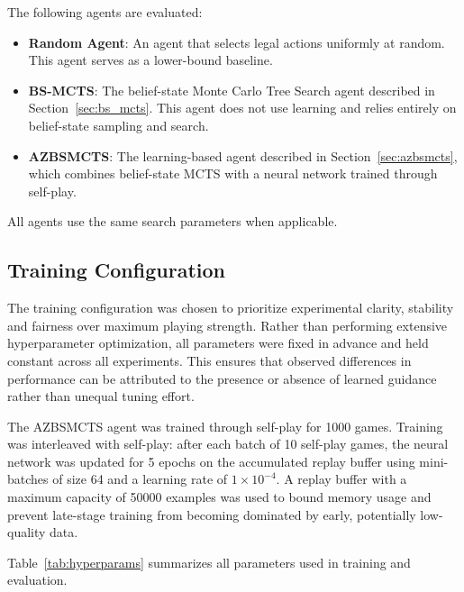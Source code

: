 \documentclass[12pt,oneside,openright]{article}
\begin{document}
The following agents are evaluated:

\begin{itemize}
  \item \textbf{Random Agent}: An agent that selects legal actions uniformly at random. This agent serves as a lower-bound baseline.
  \item \textbf{BS-MCTS}: The belief-state Monte Carlo Tree Search agent described in Section~\ref{sec:bs_mcts}. This agent does not use learning and relies entirely on belief-state sampling and search.
  \item \textbf{AZBSMCTS}: The learning-based agent described in Section~\ref{sec:azbsmcts}, which combines belief-state MCTS with a neural network trained through self-play.
\end{itemize}

All agents use the same search parameters when applicable.

\subsection{Training Configuration}
\label{sec:params}
The training configuration was chosen to prioritize experimental clarity, stability and fairness over maximum playing strength. Rather than performing extensive hyperparameter optimization, all parameters were fixed in advance and held constant across all experiments. This ensures that observed differences in performance can be attributed to the presence or absence of learned guidance rather than unequal tuning effort.

The AZBSMCTS agent was trained through self-play for 1000 games. Training was
interleaved with self-play: after each batch of 10 self-play games, the neural network
was updated for 5 epochs on the accumulated replay buffer using mini-batches of size
64 and a learning rate of $1 \times 10^{-4}$. A replay buffer with a maximum capacity of 50000 examples was used to bound memory usage and prevent late-stage training from becoming dominated by early, potentially low-quality data.

Table~\ref{tab:hyperparams} summarizes all parameters used in training and evaluation.
\end{document}
